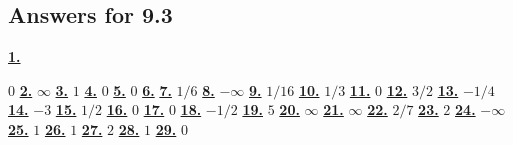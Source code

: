 \subsection *{Answers for 9.3}
\hypertarget {a:9.3.1}{\hyperlink {e:9.3.1}{\bfseries 1.}} \mdseries $0$\qquad 
\hypertarget {a:9.3.2}{\hyperlink {e:9.3.2}{\bfseries 2.}} \mdseries $\infty $\qquad 
\hypertarget {a:9.3.3}{\hyperlink {e:9.3.3}{\bfseries 3.}} \mdseries $1$\qquad 
\hypertarget {a:9.3.4}{\hyperlink {e:9.3.4}{\bfseries 4.}} \mdseries $0$\qquad 
\hypertarget {a:9.3.5}{\hyperlink {e:9.3.5}{\bfseries 5.}} \mdseries $0$\qquad 
\hypertarget {a:9.3.6}{\hyperlink {e:9.3.6}{\bfseries 6.}} \qquad 
\hypertarget {a:9.3.7}{\hyperlink {e:9.3.7}{\bfseries 7.}} \mdseries $1/6$\qquad 
\hypertarget {a:9.3.8}{\hyperlink {e:9.3.8}{\bfseries 8.}} \mdseries $-\infty $\qquad 
\hypertarget {a:9.3.9}{\hyperlink {e:9.3.9}{\bfseries 9.}} \mdseries $1/16$\qquad 
\hypertarget {a:9.3.10}{\hyperlink {e:9.3.10}{\bfseries 10.}} \mdseries $1/3$\qquad 
\hypertarget {a:9.3.11}{\hyperlink {e:9.3.11}{\bfseries 11.}} \mdseries $0$\qquad 
\hypertarget {a:9.3.12}{\hyperlink {e:9.3.12}{\bfseries 12.}} \mdseries $3/2$\qquad 
\hypertarget {a:9.3.13}{\hyperlink {e:9.3.13}{\bfseries 13.}} \mdseries $-1/4$\qquad 
\hypertarget {a:9.3.14}{\hyperlink {e:9.3.14}{\bfseries 14.}} \mdseries $-3$\qquad 
\hypertarget {a:9.3.15}{\hyperlink {e:9.3.15}{\bfseries 15.}} \mdseries $1/2$\qquad 
\hypertarget {a:9.3.16}{\hyperlink {e:9.3.16}{\bfseries 16.}} \mdseries $0$\qquad 
\hypertarget {a:9.3.17}{\hyperlink {e:9.3.17}{\bfseries 17.}} \mdseries $0$\qquad 
\hypertarget {a:9.3.18}{\hyperlink {e:9.3.18}{\bfseries 18.}} \mdseries $-1/2$\qquad 
\hypertarget {a:9.3.19}{\hyperlink {e:9.3.19}{\bfseries 19.}} \mdseries $5$\qquad 
\hypertarget {a:9.3.20}{\hyperlink {e:9.3.20}{\bfseries 20.}} \mdseries $\infty $\qquad 
\hypertarget {a:9.3.21}{\hyperlink {e:9.3.21}{\bfseries 21.}} \mdseries $\infty $\qquad 
\hypertarget {a:9.3.22}{\hyperlink {e:9.3.22}{\bfseries 22.}} \mdseries $2/7$\qquad 
\hypertarget {a:9.3.23}{\hyperlink {e:9.3.23}{\bfseries 23.}} \mdseries $2$\qquad 
\hypertarget {a:9.3.24}{\hyperlink {e:9.3.24}{\bfseries 24.}} \mdseries $-\infty $\qquad 
\hypertarget {a:9.3.25}{\hyperlink {e:9.3.25}{\bfseries 25.}} \mdseries $1$\qquad 
\hypertarget {a:9.3.26}{\hyperlink {e:9.3.26}{\bfseries 26.}} \mdseries $1$\qquad 
\hypertarget {a:9.3.27}{\hyperlink {e:9.3.27}{\bfseries 27.}} \mdseries $2$\qquad 
\hypertarget {a:9.3.28}{\hyperlink {e:9.3.28}{\bfseries 28.}} \mdseries $1$\qquad 
\hypertarget {a:9.3.29}{\hyperlink {e:9.3.29}{\bfseries 29.}} \mdseries $0$\qquad 
